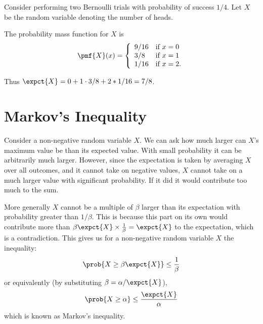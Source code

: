 \begin{flex}
\begin{example}
Consider performing two Bernoulli trials with probability of success $1/4$.
Let $X$ be the random variable denoting the number of heads.

The probability mass function for $X$ is
\[
\pmf{X}(x) = 
\left\{
\begin{array}{ll}
9/16 & \mbox{if}~x = 0
\\
3/8 & \mbox{if}~x = 1
\\
1/16 & \mbox{if}~x = 2.
\end{array}
\right.
\]

Thus $\expct{X} = 0 + 1 \cdot 3/8 + 2 * 1/16 = 7/8$.
\end{example}

\end{flex}


\section{Markov's Inequality}
\label{sec:probability::expectation::markov}

\begin{gram}
Consider a non-negative random variable $X$.  We can ask how much
larger can $X$'s maximum value be than its expected value.  With small
probability it can be arbitrarily much larger.  However, since the
expectation is taken by averaging $X$ over all outcomes, and it cannot
take on negative values, $X$ cannot take on a much larger value with
significant probability.  If it did it would contribute too much to
the sum.
\end{gram}

\begin{exercise} 
\end{exercise} 

\begin{gram}
More generally $X$ cannot be a multiple of $\beta$ larger than its
expectation with probability greater than $1/\beta$.  This is because
this part on its own would contribute more than $\beta \expct{X}
\times \frac{1}{\beta} = \expct{X}$ to the expectation, which is a
contradiction.  This gives us for a non-negative random variable $X$
the inequality:
\[ \prob{X \geq \beta\expct{X}} \leq \frac{1}{\beta} \]
or equivalently (by substituting $\beta = \alpha/\expct{X}$),
\[ \prob{X \geq \alpha} \leq \frac{\expct{X}}{\alpha} \]
which is known as Markov's inequality.
\end{gram}


